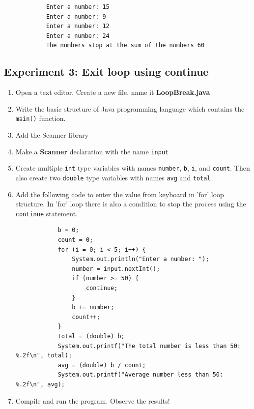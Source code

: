 \documentclass[12pt,titlepage]{article}
\begin{document}
\begin{enumerate}
{        \begin{verbatim}
            Enter a number: 15
            Enter a number: 9
            Enter a number: 12
            Enter a number: 24
            The numbers stop at the sum of the numbers 60
        \end{verbatim}
    }
\end{enumerate}

\pagebreak

\subsection{Experiment 3: Exit loop using continue}
\begin{enumerate}
    \item Open a text editor. Create a new file, name it \textbf{LoopBreak.java}
    \item Write the basic structure of Java programming language which contains the \texttt{main()} function.
    \item Add the Scanner library
    \item Make a \textbf{Scanner} declaration with the name \texttt{input}
    \item {
        Create multiple \texttt{int} type variables with names \texttt{number}, \texttt{b}, \texttt{i}, and \texttt{count}.
        Then also create two \texttt{double} type variables with names \texttt{avg} and \texttt{total}
    }
    \item {
        Add the following code to enter the value from keyboard in 'for' loop structure.
        In 'for' loop there is also a condition to stop the process using the \texttt{continue} statement.

        \begin{verbatim}
            b = 0;
            count = 0;
            for (i = 0; i < 5; i++) {
                System.out.println("Enter a number: ");
                number = input.nextInt();
                if (number >= 50) {
                    continue;
                }
                b += number;
                count++;
            }
            total = (double) b;
            System.out.printf("The total number is less than 50: %.2f\n", total);
            avg = (double) b / count;
            System.out.printf("Average number less than 50: %.2f\n", avg);
        \end{verbatim}
    }
    \pagebreak
    \item {
        Compile and run the program. Observe the results!

}
\end{enumerate}
\end{document}
